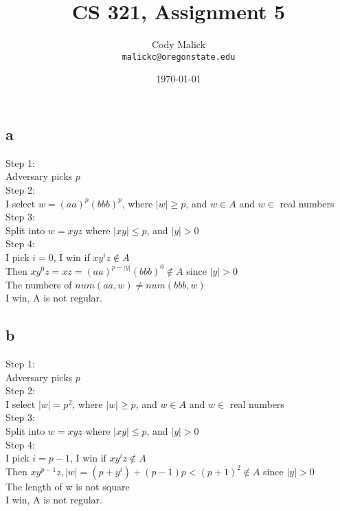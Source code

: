 \documentclass[10pt,letterpaper]{article}
\begin{document}
  \title{CS 321, Assignment 5}
  \author{Cody Malick\\
  \texttt{malickc@oregonstate.edu}}
  \date{\today}
  \maketitle

\section{}
\subsection*{a}
	Step 1:\\
	Adversary picks $p$\\
	Step 2:\\
	I select $w=(aa)^p (bbb)^p$, where $|w| \ge p$, and $w \in A$ and $w \in
	$ real numbers\\
	Step 3:\\
	Split into $w=xyz$ where $|xy| \le p$, and $|y|>0$ \\
	Step 4:\\
	I pick $i=0$, I win if $xy^iz \notin A$\\
	Then $xy^0z=xz=(aa)^{p-|y|}(bbb)^0 \notin A$ since $|y|>0$\\
	The numbers of $num(aa,w) \ne num(bbb,w)$\\
	I win, A is not regular. 
\subsection*{b}
	Step 1:\\
	Adversary picks $p$\\
	Step 2:\\
	I select $|w|=p^2$, where $|w| \ge p$, and $w \in A$ and $w \in
	$ real numbers\\
	Step 3:\\
	Split into $w=xyz$ where $|xy| \le p$, and $|y|>0$ \\
	Step 4:\\
	I pick $i=p-1$, I win if $xy^iz \notin A$\\
	Then $xy^{p-1}z, |w|=(p+y^i)+(p-1)p < (p+1)^2 \notin A$ since $|y|>0$\\
	The length of w is not square\\
	I win, A is not regular. 
\section{}
\end{document}
